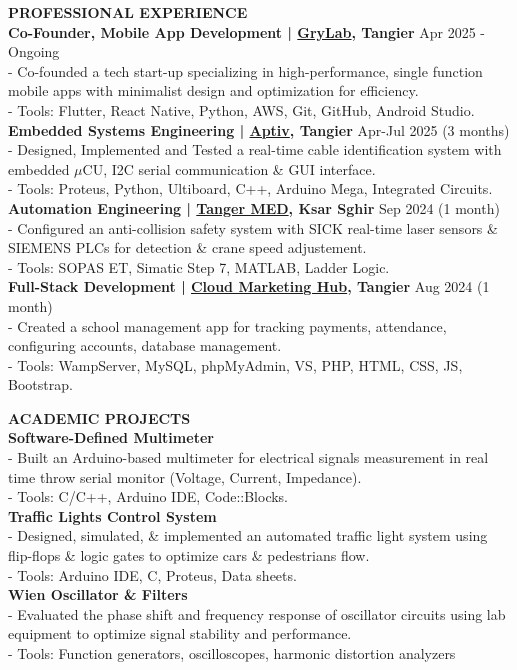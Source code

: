 \documentclass{article}
\begin{document}
\begin{minipage}[t]{0.66\textwidth}
\vspace{1.5em}
{\color{sectionteal}\large\bfseries PROFESSIONAL EXPERIENCE} \\[0.05em]
\textbf{Co-Founder, Mobile App Development | \href{https://www.grylab.com}{GryLab}, Tangier} \hfill Apr 2025 - Ongoing \\
- Co-founded a tech start-up specializing in high-performance, single function mobile apps with minimalist design and optimization for efficiency. \\[0.3em]
- Tools: Flutter, React Native, Python, AWS, Git, GitHub, Android Studio. \\[0.5em]
\textbf{Embedded Systems Engineering | \href{https://www.aptiv.com}{Aptiv}, Tangier} \hfill Apr-Jul 2025 (3 months) \\
- Designed, Implemented and Tested a real-time cable identification system with embedded $\mu$CU, I2C serial communication \& GUI interface. \\[0.3em]
- Tools: Proteus, Python, Ultiboard, C++, Arduino Mega, Integrated Circuits. \\[0.5em]
\textbf{Automation Engineering | \href{https://www.spia.ma/}{Tanger MED}, Ksar Sghir} \hfill Sep 2024 (1 month) \\
- Configured an anti-collision safety system with SICK real-time laser sensors \& SIEMENS PLCs for detection \& crane speed adjustement. \\[0.3em]
- Tools: SOPAS ET, Simatic Step 7, MATLAB, Ladder Logic. \\[0.5em]
\textbf{Full-Stack Development | \href{http://www.cloudmarketinghub.net/}{Cloud Marketing Hub}, Tangier} \hfill Aug 2024 (1 month) \\
- Created a school management app for tracking payments, attendance, configuring accounts, database management. \\[0.3em]
- Tools: WampServer, MySQL, phpMyAdmin, VS, PHP, HTML, CSS, JS, Bootstrap.

\vspace{1.5em}
{\color{sectionteal}\large\bfseries ACADEMIC PROJECTS} \\[0.05em]
\textbf{Software-Defined Multimeter} \\
- Built an Arduino-based multimeter for electrical signals measurement in real time throw serial monitor (Voltage, Current, Impedance). \\[0.3em]
- Tools: C/C++, Arduino IDE, Code::Blocks. \\[0.3em]
\textbf{Traffic Lights Control System} \\
- Designed, simulated, \& implemented an automated traffic light system using flip-flops \& logic gates to optimize cars \& pedestrians flow. \\[0.3em]
- Tools: Arduino IDE, C, Proteus, Data sheets. \\[0.5em]
\textbf{Wien Oscillator \& Filters} \\
- Evaluated the phase shift and frequency response of oscillator circuits using lab equipment to optimize signal stability and performance. \\[0.3em]
- Tools: Function generators, oscilloscopes, harmonic distortion analyzers
\end{minipage}
\end{document}
